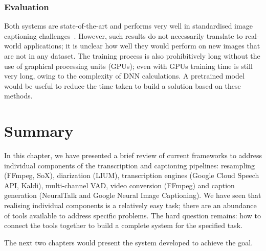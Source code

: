 \subsubsection{Evaluation}

Both systems are state-of-the-art and performs very well in standardised
image captioning challenges~\cite{nrtalk,google-img}. However, such results do
not necessarily translate to real-world applications; it is unclear how well
they would perform on new images that are not in any dataset. The training
process is also prohibitively long without the use of graphical processing
units (GPUs); even with GPUs training time is still very long, owing to the 
complexity of DNN calculations. A pretrained model would be useful to reduce
the time taken to build a solution based on these methods.

\section{Summary}\label{sec:lr:summ}

In this chapter, we have presented a brief review of current frameworks to
address individual components of the transcription and captioning pipelines:
resampling (FFmpeg, SoX), diarization (LIUM), transcription engines (Google
Cloud Speech API, Kaldi), multi-channel VAD, video conversion (FFmpeg) and
caption generation (NeuralTalk and Google Neural Image Captioning). We have
seen that realising individual components is a relatively easy task; there
are an abundance of tools available to address specific problems. The hard
question remains: how to connect the tools together to build a complete
system for the specified task.

The next two chapters would present the system developed to achieve the
goal.

